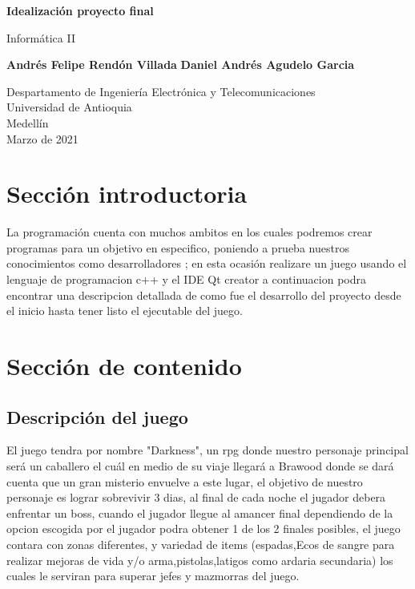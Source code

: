 \documentclass{article}
\begin{document}
\begin{titlepage}
    \begin{center}
        \vspace*{1cm}
            
        \Huge
        \textbf{Idealización proyecto final}
            
        \vspace{0.5cm}
        \LARGE
        Informática II
            
        \vspace{1.5cm}
            
        \textbf{Andrés Felipe Rendón Villada}
        \newline
        \textbf{Daniel Andrés Agudelo Garcia}
            
        \vfill
            
        \vspace{0.8cm}
            
        \Large
        Despartamento de Ingeniería Electrónica y Telecomunicaciones\\
        Universidad de Antioquia\\
        Medellín\\
        Marzo de 2021
            
    \end{center}
\end{titlepage}

\tableofcontents
\newpage
\section{Sección introductoria}\label{intro}
La programación cuenta con muchos ambitos en los cuales podremos crear programas para un objetivo en especifico, poniendo a prueba nuestros conocimientos como desarrolladores ; en esta ocasión realizare un juego usando el lenguaje de programacion c++ y el IDE Qt creator a continuacion podra encontrar una descripcion detallada de como fue el desarrollo del proyecto desde el inicio hasta tener listo el ejecutable del juego.

\section{Sección de contenido} \label{contenido}

\subsection{Descripción del juego}
El juego tendra por nombre "Darkness", un rpg donde nuestro personaje principal será un caballero el cuál en medio de su viaje llegará a Brawood donde se dará cuenta que un gran misterio envuelve a este lugar, el objetivo de nuestro personaje es lograr sobrevivir 3 dias, al final de cada noche el jugador debera enfrentar un boss, cuando el jugador llegue al amancer final dependiendo de la opcion escogida por el jugador podra obtener 1 de los 2 finales posibles, el juego contara con zonas diferentes, y variedad de items (espadas,Ecos de sangre para realizar mejoras de vida y/o arma,pistolas,latigos como ardaria secundaria) los cuales le serviran para superar jefes y mazmorras del juego.
\end{document}
